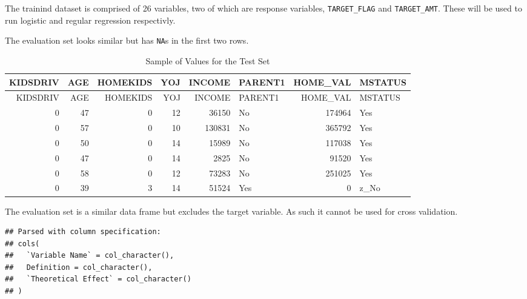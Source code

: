 \documentclass[]{article}
\begin{document}
The trainind dataset is comprised of 26 variables, two of which are
response variables, \texttt{TARGET\_FLAG} and \texttt{TARGET\_AMT}.
These will be used to run logistic and regular regression respectivly.

The evaluation set looks similar but has \texttt{NA}s in the first two
rows.

\begin{longtable}[]{@{}rrrrrlrl@{}}
\caption{Sample of Values for the Test Set}\tabularnewline
\toprule
KIDSDRIV & AGE & HOMEKIDS & YOJ & INCOME & PARENT1 & HOME\_VAL &
MSTATUS\tabularnewline
\midrule
\endfirsthead
\toprule
KIDSDRIV & AGE & HOMEKIDS & YOJ & INCOME & PARENT1 & HOME\_VAL &
MSTATUS\tabularnewline
\midrule
\endhead
0 & 47 & 0 & 12 & 36150 & No & 174964 & Yes\tabularnewline
0 & 57 & 0 & 10 & 130831 & No & 365792 & Yes\tabularnewline
0 & 50 & 0 & 14 & 15989 & No & 117038 & Yes\tabularnewline
0 & 47 & 0 & 14 & 2825 & No & 91520 & Yes\tabularnewline
0 & 58 & 0 & 12 & 73283 & No & 251025 & Yes\tabularnewline
0 & 39 & 3 & 14 & 51524 & Yes & 0 & z\_No\tabularnewline
\bottomrule
\end{longtable}

The evaluation set is a similar data frame but excludes the target
variable. As such it cannot be used for cross validation.

\begin{verbatim}
## Parsed with column specification:
## cols(
##   `Variable Name` = col_character(),
##   Definition = col_character(),
##   `Theoretical Effect` = col_character()
## )
\end{verbatim}
\end{document}
